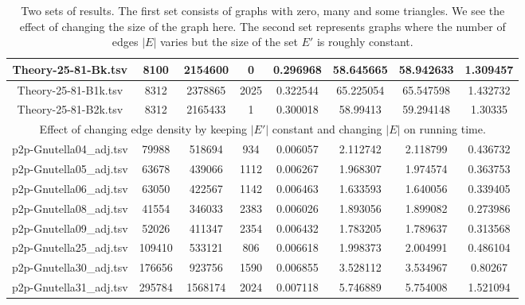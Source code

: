 \documentclass[conference]{IEEEtran}
\begin{document}
\begin{table*}[ht]
\begin{tabular}{|c || c | c | c || c | c | c || c |}
 \hline 
 Theory-25-81-Bk.tsv & 8100 & 2154600 & 0 & 0.296968 & 58.645665 & 58.942633 & 1.309457 \\
 \hline
 Theory-25-81-B1k.tsv & 8312 & 2378865 & 2025 & 0.322544 & 65.225054 & 65.547598 & 1.432732 \\
 \hline
 Theory-25-81-B2k.tsv & 8312 & 2165433 & 1 & 0.300018 & 58.99413 & 59.294148 & 1.30335 \\
 \hline
 \multicolumn{8}{c}{Effect of changing edge density by keeping $|E'|$ constant  and changing $|E|$ on running time.} \\
 \hline
 p2p-Gnutella04\_adj.tsv & 79988 & 518694 & 934 & 0.006057 & 2.112742 & 2.118799 & 0.436732 \\
 \hline
 p2p-Gnutella05\_adj.tsv & 63678 & 439066 & 1112 & 0.006267 & 1.968307 & 1.974574 & 0.363753\\
 \hline
 p2p-Gnutella06\_adj.tsv & 63050 & 422567 & 1142 & 0.006463 & 1.633593 & 1.640056 & 0.339405 \\
 \hline
 p2p-Gnutella08\_adj.tsv & 41554 & 346033 & 2383 & 0.006026 & 1.893056 & 1.899082 & 0.273986 \\
 \hline
 p2p-Gnutella09\_adj.tsv & 52026 & 411347 & 2354 & 0.006432 & 1.783205 & 1.789637 & 0.313568 \\
 \hline
 p2p-Gnutella25\_adj.tsv & 109410 & 533121 & 806 & 0.006618 & 1.998373 & 2.004991 & 0.486104 \\
 \hline
 p2p-Gnutella30\_adj.tsv & 176656 & 923756 & 1590 & 0.006855 & 3.528112 & 3.534967 & 0.80267 \\
 \hline
 p2p-Gnutella31\_adj.tsv & 295784 & 1568174 & 2024 & 0.007118 & 5.746889 & 5.754008 & 1.521094 \\
 \hline

\end{tabular}
 \caption{Two sets of results. The first set consists of graphs with zero, many and some triangles. We see the effect of changing the size of the graph here. The second set represents graphs where the number of edges $|E|$ varies but the size of the set $E'$ is roughly constant.}
 \label{table_result_runtimes}
\end{table*}
\end{document}
